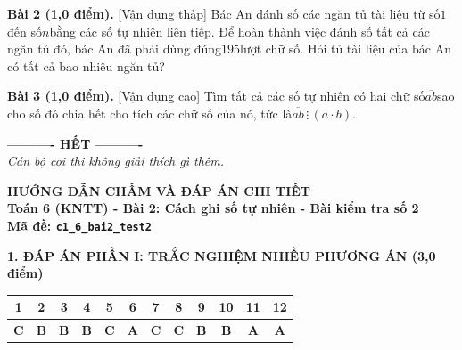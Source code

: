 \documentclass[11pt,a4paper]{article}
\begin{document}
\noindent\textbf{Bài 2 (1,0 điểm).} [Vận dụng thấp] Bác An đánh số các ngăn tủ tài liệu từ số$1$đến số$n$bằng các số tự nhiên liên tiếp. Để hoàn thành việc đánh số tất cả các ngăn tủ đó, bác An đã phải dùng đúng$195$lượt chữ số. Hỏi tủ tài liệu của bác An có tất cả bao nhiêu ngăn tủ?\par\vspace{8pt}

\noindent\textbf{Bài 3 (1,0 điểm).} [Vận dụng cao] Tìm tất cả các số tự nhiên có hai chữ số$\overline{ab}$sao cho số đó chia hết cho tích các chữ số của nó, tức là$\overline{ab} \,\vdots\, (a \cdot b)$.\par\vspace{8pt}


\begin{center}
\textbf{---------- HẾT ----------}\\
\textit{\small Cán bộ coi thi không giải thích gì thêm.}
\end{center}

\newpage
\begin{center}
{\Large\bfseries HƯỚNG DẪN CHẤM VÀ ĐÁP ÁN CHI TIẾT}\\[4pt]
{\large\bfseries Toán 6 (KNTT) - Bài 2: Cách ghi số tự nhiên - Bài kiểm tra số 2}\\[2pt]
{\bfseries Mã đề: \texttt{c1\_6\_bai2\_test2}}
\end{center}

\vspace{10pt}
\noindent\textbf{\large 1. ĐÁP ÁN PHẦN I: TRẮC NGHIỆM NHIỀU PHƯƠNG ÁN (3,0 điểm)}
\vspace{4pt}
\begin{center}
\begin{tabular}{|c|c|c|c|c|c|c|c|c|c|c|c|}
\hline
\textbf{1} & \textbf{2} & \textbf{3} & \textbf{4} & \textbf{5} & \textbf{6} & \textbf{7} & \textbf{8} & \textbf{9} & \textbf{10} & \textbf{11} & \textbf{12} \\
\hline
\textbf{C} & \textbf{B} & \textbf{B} & \textbf{B} & \textbf{C} & \textbf{A} & \textbf{C} & \textbf{C} & \textbf{B} & \textbf{B} & \textbf{A} & \textbf{A} \\
\hline
\end{tabular}
\end{center}
\vspace{6pt}
\end{document}
